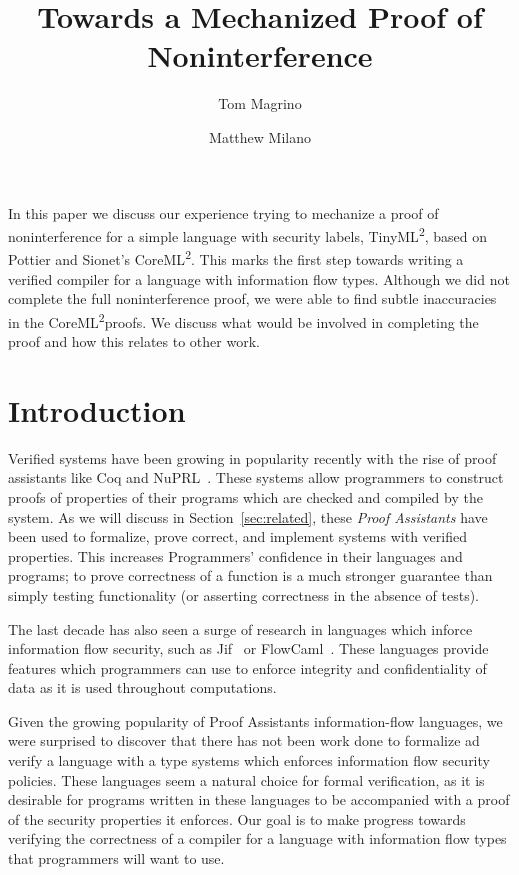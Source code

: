\documentclass[a4paper,twocolumn]{article}
\title{Towards a Mechanized Proof of Noninterference}
\author{Tom Magrino \and Matthew Milano}
\newcommand{\langName}[0]{TinyML\textsuperscript{2}}
\newcommand{\origLang}[0]{CoreML\textsuperscript{2}}
\theoremstyle{plain}
\theoremstyle{definition}
\begin{document}
\maketitle

\abstract

In this paper we discuss our experience trying to mechanize a proof of
noninterference for a simple language with security labels, \langName, based on Pottier and Sionet's \origLang.  This
marks the first step towards writing a verified compiler for a language with
information flow types.  Although we did not complete the full noninterference
proof, we were able to find subtle inaccuracies in the \origLang proofs.  
We discuss what would be involved in completing the proof and how this 
relates to other work.

\section{Introduction}

Verified systems have been growing in popularity recently with the rise of proof
assistants like Coq and NuPRL~\cite{coqart,nuprl}.  
These systems allow programmers to construct proofs of properties of their programs which are checked and compiled by the system.  As we will
discuss in Section~\ref{sec:related}, these \emph{Proof Assistants} have been used to formalize,
prove correct, and implement systems with verified properties.  This increases Programmers' confidence in their languages and programs; to prove correctness of a function is a much stronger guarantee than simply testing functionality (or asserting correctness in the absence of tests).

The last decade has also seen a surge of research in languages which inforce information flow security, such as Jif~\cite{myers1999jflow} or FlowCaml~\cite{simonet2003flow}.  These languages provide features which programmers can use to enforce integrity and confidentiality of data as it is used throughout computations.

Given the growing popularity of Proof Assistants information-flow languages, we were surprised to discover 
that there has not been work done to formalize ad verify a language with a type systems which enforces information flow security policies.
These languages seem a natural choice for formal verification, as it is desirable for programs written in these languages to be accompanied with a proof of the security properties it enforces.
Our goal is to make progress towards verifying the correctness of a
compiler for a language with information flow types that programmers will want
to use.
\end{document}
